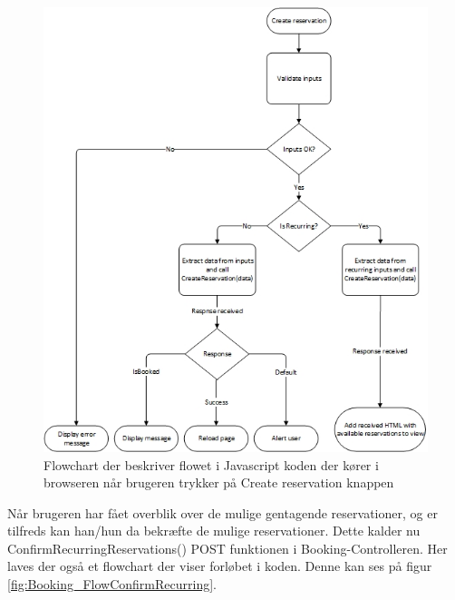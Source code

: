 \begin{figure}[H]
  \includegraphics[width=\linewidth]{01_Billeder/10_Design_og_implementering/Booking/FlowChart_ClientCreateReservation.jpg}
  \centering
  \caption{Flowchart der beskriver flowet i Javascript koden der kører i browseren når brugeren trykker på Create reservation knappen}
  \label{fig:Booking_FlowClientCreateReservation}
\end{figure}

Når brugeren har fået overblik over de mulige gentagende reservationer, og er tilfreds kan han/hun da bekræfte de mulige reservationer. Dette kalder nu ConfirmRecurringReservations() POST funktionen i Booking-Controlleren. Her laves der også et flowchart der viser forløbet i koden. Denne kan ses på figur \ref{fig:Booking_FlowConfirmRecurring}.   

